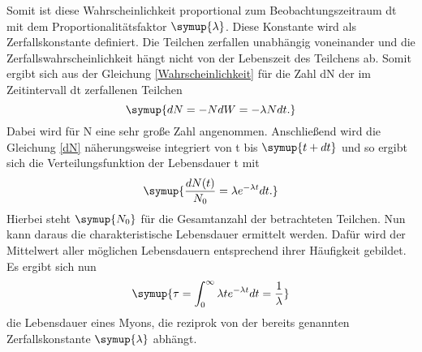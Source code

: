 \noindent Somit ist diese Wahrscheinlichkeit proportional zum Beobachtungszeitraum dt mit dem Proportionalitätsfaktor $\symup{\lambda}$. Diese Konstante wird als Zerfallskonstante definiert. \newline
\noindent Die Teilchen zerfallen unabhängig voneinander und die Zerfallswahrscheinlichkeit hängt nicht von der Lebenszeit des Teilchens ab. Somit ergibt sich aus der Gleichung \ref{Wahrscheinlichkeit} für die Zahl dN der im Zeitintervall dt zerfallenen Teilchen
\begin{equation}
\label{dN}
\symup{dN = -NdW = -\lambda N dt  .}
\end{equation} 
\noindent Dabei wird für N eine sehr große Zahl angenommen. Anschließend wird die Gleichung \ref{dN} näherungsweise integriert von t bis $\symup{t+dt}$ und so ergibt sich die Verteilungsfunktion der Lebensdauer t mit
\begin{equation}
\label{Verteilungsfkt}
\symup{\frac{dN(t)}{N_0} = \lambda e^{-\lambda t} dt.}
\end{equation}
\noindent Hierbei steht $\symup{N_0}$ für die Gesamtanzahl der betrachteten Teilchen. Nun kann daraus die charakteristische Lebensdauer ermittelt werden. Dafür wird der Mittelwert aller möglichen Lebensdauern entsprechend ihrer Häufigkeit gebildet. Es ergibt sich nun
\begin{equation}
\label{Lebensdauer}
\symup{\tau = \int_0^\infty \lambda t e^{-\lambda t} dt = \frac{1}{\lambda}}
\end{equation}
\noindent die Lebensdauer eines Myons, die reziprok von der bereits genannten Zerfallskonstante $\symup{\lambda}$ abhängt.
